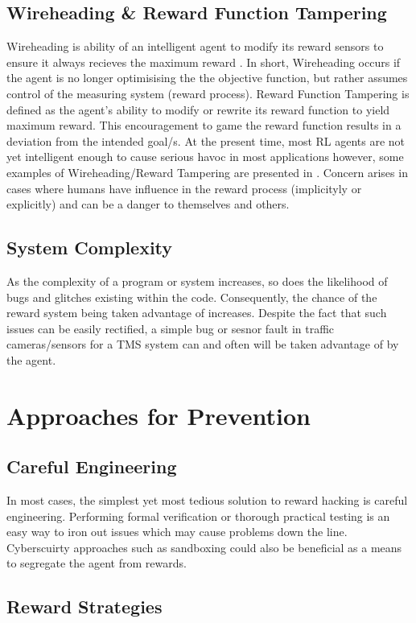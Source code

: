 \subsection{Wireheading \& Reward Function Tampering}
Wireheading is ability of an intelligent agent to modify its reward sensors to ensure it always recieves the maximum reward \cite{JOO2020324}. 
In short, Wireheading occurs if the agent is no longer optimisising the the objective function, but rather assumes control of the measuring system (reward process).
Reward Function Tampering is defined as the agent's ability to modify or rewrite its reward function to yield maximum reward.
This encouragement to game the reward function results in a deviation from the intended goal/s. 
At the present time, most RL agents are not yet intelligent enough to cause serious havoc in most applications however, some examples of Wireheading/Reward Tampering are presented in \cite{DBLP:journals/corr/abs-1908-04734}.  
Concern arises in cases where humans have influence in the reward process (implicityly or explicitly) and can be a danger to themselves and others.

\subsection{System Complexity}
As the complexity of a program or system increases, so does the likelihood of bugs and glitches existing within the code.
Consequently, the chance of the reward system being taken advantage of increases. 
Despite the fact that such issues can be easily rectified, a simple bug or sesnor fault in traffic cameras/sensors  for a TMS system can and often will be taken advantage of by the agent. 


\section{Approaches for Prevention}
\subsection{Careful Engineering}
In most cases, the simplest yet most tedious solution to reward hacking is careful engineering.
Performing formal verification or thorough practical testing is an easy way to iron out issues which may cause problems down the line.
Cyberscuirty approaches such as sandboxing could also be beneficial as a means to segregate the agent from rewards.

\subsection{Reward Strategies}

